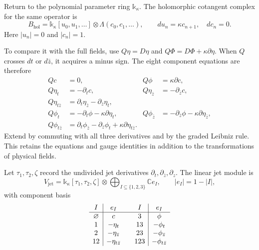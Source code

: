 Return to the polynomial parameter ring \(\mathbb k_\kappa\).
The\label{pcsm:def:h373-holomorphic-cotangent-complex} holomorphic cotangent complex for the same operator is
\begin{equation}\label{pcsm:local}
 B_{\mathrm{hol}}=
 \mathbb k_\kappa[u_0,u_1,\ldots]\otimes\Lambda(c_0,c_1,\ldots),
 \qquad du_n=\kappa c_{n+1},\quad dc_n=0.
\end{equation}
Here \(|u_n|=0\) and \(|c_n|=1\).

To compare it with the full fields, use
\(Q\eta=D\eta\) and \(Q\Phi=D\Phi+\kappa\partial\eta\).
When \(Q\) crosses \(dt\) or \(d\bar z\), it acquires a minus sign.
The eight component equations are therefore
\begin{equation}\label{pcsm:eq:component-Q}
\begin{aligned}
 Qc&=0,& Q\phi&=\kappa\partial c,\\
 Q\eta_t&=-\partial_t c,&
 Q\eta_{\bar z}&=-\partial_{\bar z}c,\\
 Q\eta_{t\bar z}&=\partial_t\eta_{\bar z}
                          -\partial_{\bar z}\eta_t,\\
 Q\phi_t&=-\partial_t\phi-\kappa\partial\eta_t,&
 Q\phi_{\bar z}&=-\partial_{\bar z}\phi
                                   -\kappa\partial\eta_{\bar z},\\
 Q\phi_{t\bar z}&=\partial_t\phi_{\bar z}
              -\partial_{\bar z}\phi_t+\kappa\partial\eta_{t\bar z}.
\end{aligned}
\end{equation}
Extend by commuting with all three derivatives and by the graded
Leibniz rule. This retains the equations and gauge identities in
addition to the transformations of physical fields.

Let\label{pcsm:def:component-jet-module} \(\tau_1,\tau_2,\zeta\) record the undivided jet derivatives
\(\partial_t,\partial_{\bar z},\partial_z\).
The linear jet module is
\[
 V_{\mathrm{jet}}=\mathbb k_\kappa[\tau_1,\tau_2,\zeta]
             \otimes\bigoplus_{I\subseteq\{1,2,3\}}\mathbb C e_I,
 \qquad |e_I|=1-|I|,
\]
with component basis
\[
\begin{array}{c|c@{\qquad}c|c}
 I&e_I&I&e_I\\ \hline
 \varnothing&c&3&\phi\\
 1&-\eta_t&13&-\phi_t\\
 2&-\eta_{\bar z}&23&-\phi_{\bar z}\\
 12&-\eta_{t\bar z}&123&-\phi_{t\bar z}
\end{array}
\]

